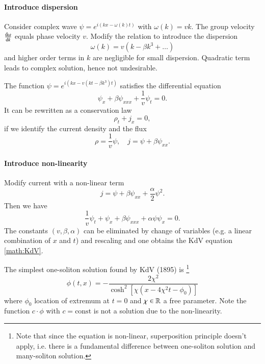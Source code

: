 \paragraph{Introduce dispersion} Consider complex wave $\psi = e^{i(kx - \omega(k)t)}$ with $\omega(k) = vk$. The group velocity $\dv{\omega}{k} $ equals phase velocity $v$. Modify the relation to introduce the dispersion
\begin{equation*}
	\omega(k) = v(k - \beta k^3 + \dots)
\end{equation*}
and higher order terms in $k$ are negligible for small dispersion. Quadratic term leads to complex solution, hence not undesirable.

The function $\psi = e^{i(kx - v(kt - \beta k^3 )t)}$ satisfies the differential equation
\begin{equation*}
	\psi_{x} + \beta \psi_{x x x} + \frac{1}{v} \psi_t = 0.
\end{equation*}
It can be rewritten as a conservation law
\begin{equation*}
	\rho_t + j_{x} = 0,
\end{equation*}
if we identify the current density and the flux
\begin{equation*}
	\rho = \frac{1}{v} \psi, \quad j = \psi + \beta \psi_{x x}.
\end{equation*}

\paragraph{Introduce non-linearity} Modify current with a non-linear term
\begin{equation*}
	j = \psi + \beta \psi_{x x} + \frac{\alpha}{2} \psi^2 .
\end{equation*}
Then we have 
\begin{equation*}
	\frac{1}{v} \psi_t + \psi_x + \beta \psi_{ x x x} + \alpha \psi \psi_x = 0.
\end{equation*}
The constants $(v, \beta, \alpha)$ can be eliminated by change of variables (e.g. a linear combination of $x$ and $t$) and rescaling and one obtains the KdV equation \eqref{math:KdV}.

The simplest one-soliton solution found by KdV (1895) is \footnote{Note that since the equation is non-linear, superposition principle doesn't apply, i.e. there is a fundamental difference between one-soliton solution and many-soliton solution.}
\begin{equation}
	\phi (t, x) = - \frac{2\chi^2}{\cosh^2[\chi(x-4\chi^2t - \phi_0)]}
	\label{math:KdV-sol}
\end{equation}
where $\phi_0$ location of extremum at $t=0$ and $\chi\in\mathbb{R}$ a free parameter. Note the function $c \cdot \phi$ with $c=\text{const}$ is not a solution due to the non-linearity.

